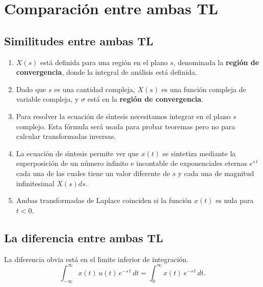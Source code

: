 \section{Comparaci\'{o}n entre ambas TL}

\subsection{Similitudes entre ambas TL}

\begin{enumerate}

\item $X\left( s\right) $ est\'{a} definida para una regi\'{o}n en el plano $s$,
denominada la \textbf{regi\'{o}n de convergencia}, donde la integral de an\'{a}lisis est\'{a} definida.

\item Dado que $s$ es una cantidad compleja, $X\left( s\right) $ es una funci\'{o}n compleja de variable 
compleja, y $\sigma $ est\'{a} en la \textbf{regi\'{o}n de convergencia}.

\item  Para resolver la ecuaci\'{o}n de s\'{\i}ntesis necesitamos integrar en el plano $s$ complejo. 
Esta f\'{o}rmula ser\'{a} usada para probar teoremas pero no para calcular transformadas inversas.

\item  La ecuaci\'{o}n de s\'{\i}ntesis permite ver que $x\left( t\right) $ se sintetiza mediante la 
superposici\'{o}n de un n\'{u}mero infinito e incontable de exponenciales eternas $e^{s \, t}$ cada una de las 
cuales tiene un valor diferente de $s$ y cada una de magnitud infinitesimal $X\left(s\right) ds.$

\item Ambas transformadas de Laplace coinciden si la funci\'{o}n $x(t)$ es nula para $t < 0$.

\end{enumerate}

\subsection{La diferencia entre ambas TL}

La diferencia obvia est\'{a} en el l\'{\i}mite inferior de integraci\'{o}n.
\begin{equation}
   \int_{-\infty }^{\infty } x(t) \, u(t) \, e^{-s \, t} \, dt = \int_{0}^{\infty} x(t) \, e^{-s \, t} \, dt.
\end{equation}

